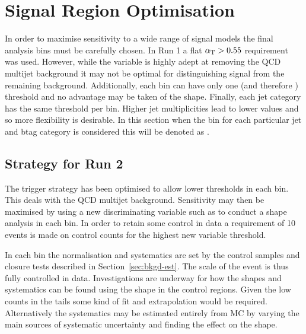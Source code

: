 
\chapter{Signal Region Optimisation} %

\label{Chapter5} %



In order to maximise sensitivity to a wide range of signal models 
the final analysis bins must be carefully chosen. 
In Run 1 a flat $\alpha_{\text{T}} > 0.55$ requirement was used. However, 
while the \alphat variable is highly adept at removing the
QCD multijet background it may not be optimal for distinguishing 
signal from the remaining background. Additionally, each bin can have
only one \alphat (and therefore \mht) threshold and no advantage 
may be taken of the shape. Finally, each jet category has the same 
\alphat threshold per \scalht bin. Higher jet multiplicities lead to 
lower \alphat values and so more flexibility is desirable. 
In this section when the \scalht bin for each particular jet and btag 
category is considered this will be denoted as \scalhtcat.


\section{Strategy for Run 2}

The trigger strategy has been optimised to allow lower \alphat thresholds in each bin. 
This deals with the QCD multijet background. Sensitivity may then be maximised
by using a new discriminating variable such as \mht to conduct a shape analysis in each bin.
In order to retain some control in data a requirement of 10 events is made
on control counts for the highest new variable threshold.

In each \scalhtcat bin the normalisation and systematics are set by the control samples
and closure tests described in Section~\ref{sec:bkgd-est}. The scale of the event is
thus fully controlled in data. Investigations are underway for how the shapes 
and systematics can be found using the shape in the control regions. Given the low
counts in the tails some kind of fit and extrapolation would be required.
Alternatively the systematics may be estimated entirely from MC by varying the main 
sources of systematic uncertainty and finding the effect on the shape.




